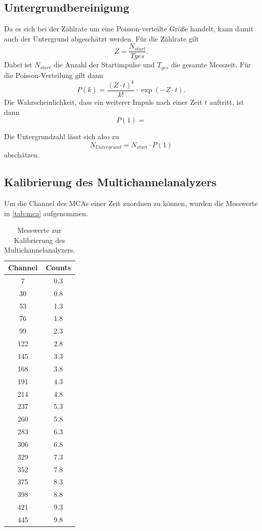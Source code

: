 \subsection{Untergrundbereinigung}

Da es sich bei der Zählrate um eine Poisson-verteilte Größe handelt, kann damit auch der Untergrund abgeschätzt werden. 
Für die Zählrate gilt
\begin{equation*}
  Z = \frac{N_{start}}{T{ges}}.
\end{equation*}
Dabei ist $N_{start}$ die Anzahl der Startimpulse und $T_{ges}$ die gesamte Messzeit. Für die Poisson-Verteilung gilt dann 
\begin{equation*}
  P(k) = \frac{(Z \cdot t)^k}{k!} \cdot \exp(-Z \cdot t).
\end{equation*}
Die Wahrscheinlichkeit, dass ein weiterer Impuls nach einer Zeit $t$ auftritt, ist dann
\begin{equation*}
  P(1) = 
\end{equation*}

Die Untergrundzahl lässt sich also zu
\begin{equation*}
  N_{Untergrund} = N_{start} \cdot P(1)
\end{equation*}
abschätzen.

\subsection{Kalibrierung des Multichannelanalyzers}

Um die Channel des MCAs einer Zeit zuordnen zu können, wurden die Messwerte in \autoref{tab:mca} aufgenommen.

\begin{table}[H]
  \centering
  \caption{Messwerte zur Kalibrierung des Multichannelanalyzers.}
  \label{tab:mca}
  \begin{tabular}{c|c}
    \hline
    \textbf{Channel} & \textbf{Counts} \\
    \hline
    7 & 0.3\\
    30 & 0.8\\
    53 & 1.3\\
    76 & 1.8\\
    99 & 2.3\\
    122 & 2.8\\
    145 & 3.3\\
    168 & 3.8\\
    191 & 4.3\\
    214 & 4.8\\
    237 & 5.3\\
    260 & 5.8\\
    283 & 6.3\\
    306 & 6.8\\
    329 & 7.3\\
    352 & 7.8\\
    375 & 8.3\\
    398 & 8.8\\
    421 & 9.3\\
    445 & 9.8
  \end{tabular}
\end{table}

